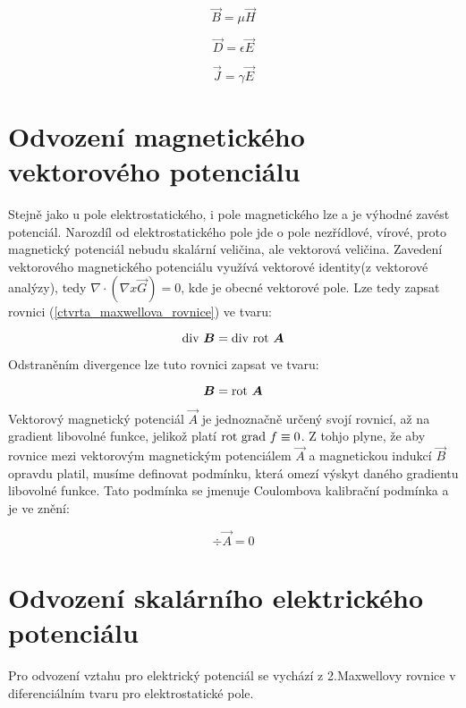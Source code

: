 \begin{equation}
	\vec{B} = \mu \vec{H} 
	\label{permeabilita}
\end{equation}

\begin{equation}
	\vec{D} = \epsilon \vec{E}
	\label{epsilon}
\end{equation}

\begin{equation}
	\vec{J} =  \gamma \vec{E}
	\label{gama}
\end{equation}

\section{Odvození magnetického vektorového potenciálu}
Stejně jako u pole elektrostatického, i pole magnetického lze a je výhodné zavést potenciál. Narozdíl od elektrostatického pole jde o pole nezřídlové, vírové, proto magnetický potenciál nebudu skalární veličina, ale vektorová veličina. Zavedení vektorového magnetického potenciálu využívá vektorové identity(z vektorové analýzy), tedy $\nabla \cdot (\nabla x \vec{G})=0$, kde  je obecné vektorové pole. Lze tedy zapsat rovnici (\ref{ctvrta_maxwellova_rovnice}) ve tvaru:

\begin{equation}
	\mathrm{div}\  \mbox{\boldmath$B$} =  \mathrm{div}\  \mathrm{rot}\  \mbox{\boldmath$A$}
	\label{odvozeni_potencial}
\end{equation}

Odstraněním divergence lze tuto rovnici zapsat ve tvaru:

\begin{equation}
	\mbox{\boldmath$B$} =  \mathrm{rot}\  \mbox{\boldmath$A$}
	\label{magneticky_vektorovy_potencial}
\end{equation}

Vektorový magnetický potenciál $\vec{A}$ je jednoznačně určený svojí rovnicí, až na gradient libovolné funkce, jelikož platí $\mathrm{rot}\  \mathrm{grad}\  f \equiv 0$. Z tohjo plyne, že aby rovnice mezi vektorovým magnetickým potenciálem $\vec{A}$ a magnetickou indukcí $\vec{B}$ opravdu platil, musíme definovat podmínku, která omezí výskyt daného gradientu libovolné funkce. Tato podmínka se jmenuje Coulombova kalibrační podmínka a je ve znění:

\begin{equation}
	\div \vec{A} =  0
	\label{coulombova_kalibracni_podminka}
\end{equation}

\section{Odvození skalárního elektrického potenciálu}
Pro odvození vztahu pro elektrický potenciál se vychází z 2.Maxwellovy rovnice v diferenciálním tvaru pro elektrostatické pole.

